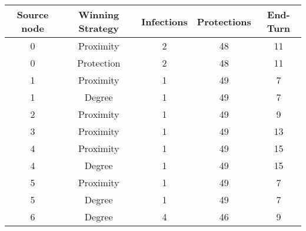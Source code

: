 \documentclass[results.tex]{subfiles}
\begin{document}
    \begin{center}
        \begin{tabular}{| c || c | c | c | c |}
            \hline
            {\bfseries Source node} & {\bfseries Winning Strategy} & {\bfseries Infections} & {\bfseries Protections}
            & {\bfseries End-Turn}
            \\  %
            \hline\hline
            0                       & Proximity                    & 2                      & 48                      & 11                   \\
            \hline
            0                       & Protection                   & 2                      & 48                      & 11                   \\
            \hline
            1                       & Proximity                    & 1                      & 49                      & 7                    \\
            \hline
            1                       & Degree                       & 1                      & 49                      & 7                    \\
            \hline
            2                       & Proximity                    & 1                      & 49                      & 9                    \\
            \hline
            3                       & Proximity                    & 1                      & 49                      & 13                   \\
            \hline
            4                       & Proximity                    & 1                      & 49                      & 15                   \\
            \hline
            4                       & Degree                       & 1                      & 49                      & 15                   \\
            \hline
            5                       & Proximity                    & 1                      & 49                      & 7                    \\
            \hline
            5                       & Degree                       & 1                      & 49                      & 7                    \\
            \hline
            6                       & Degree                       & 4                      & 46                      & 9                    \\

\end{tabular}
\end{center}
\end{document}
